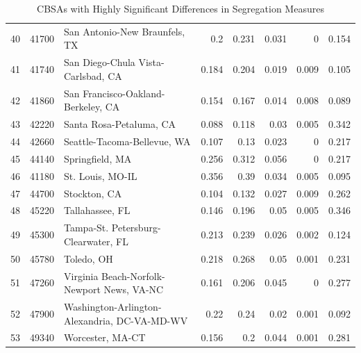 \documentclass[
  10pt,
]{article}
\begin{document}
\begin{table}[h]
\begin{center}
{\begin{tabular}{rrlrrrrr}
 40 &  41700 & San Antonio-New Braunfels, TX                &            0.2   &             0.231 &            0.031 &     0     &      0.154 \\
 41 &  41740 & San Diego-Chula Vista-Carlsbad, CA           &            0.184 &             0.204 &            0.019 &     0.009 &      0.105 \\
 42 &  41860 & San Francisco-Oakland-Berkeley, CA           &            0.154 &             0.167 &            0.014 &     0.008 &      0.089 \\
 43 &  42220 & Santa Rosa-Petaluma, CA                      &            0.088 &             0.118 &            0.03  &     0.005 &      0.342 \\
 44 &  42660 & Seattle-Tacoma-Bellevue, WA                  &            0.107 &             0.13  &            0.023 &     0     &      0.217 \\
 45 &  44140 & Springfield, MA                              &            0.256 &             0.312 &            0.056 &     0     &      0.217 \\
 46 &  41180 & St. Louis, MO-IL                             &            0.356 &             0.39  &            0.034 &     0.005 &      0.095 \\
 47 &  44700 & Stockton, CA                                 &            0.104 &             0.132 &            0.027 &     0.009 &      0.262 \\
 48 &  45220 & Tallahassee, FL                              &            0.146 &             0.196 &            0.05  &     0.005 &      0.346 \\
 49 &  45300 & Tampa-St. Petersburg-Clearwater, FL          &            0.213 &             0.239 &            0.026 &     0.002 &      0.124 \\
 50 &  45780 & Toledo, OH                                   &            0.218 &             0.268 &            0.05  &     0.001 &      0.231 \\
 51 &  47260 & Virginia Beach-Norfolk-Newport News, VA-NC   &            0.161 &             0.206 &            0.045 &     0     &      0.277 \\
 52 &  47900 & Washington-Arlington-Alexandria, DC-VA-MD-WV &            0.22  &             0.24  &            0.02  &     0.001 &      0.092 \\
 53 &  49340 & Worcester, MA-CT                             &            0.156 &             0.2   &            0.044 &     0.001 &      0.281 \\
\hline
\end{tabular}
}

\caption{CBSAs with Highly Significant Differences in Segregation Measures}
\label{tbl:one_pct_diffs}
\end{center}
\end{table}
\end{document}
